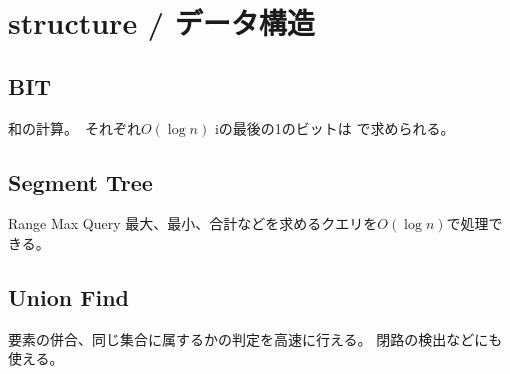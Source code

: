 \section{structure / データ構造}
\subsection{BIT}
和の計算。　それぞれ$O(\log n)$
iの最後の1のビットは  で求められる。


\subsection{Segment Tree}
Range Max Query
最大、最小、合計などを求めるクエリを$O(\log n)$で処理できる。


\subsection{Union Find}
要素の併合、同じ集合に属するかの判定を高速に行える。
閉路の検出などにも使える。


